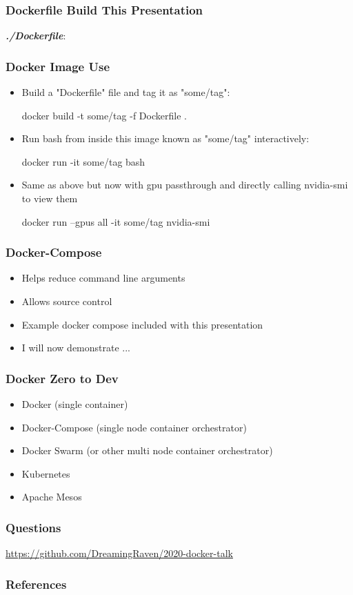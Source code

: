 \documentclass[aspectratio=169]{beamer}
\begin{document}
  \begin{frame}
    \frametitle{Dockerfile Build This Presentation}
    \textbf{\textit{./Dockerfile}}:
  \end{frame}

  \begin{frame}[fragile]%
    \frametitle{Docker Image Use}
    \begin{itemize}
        \item Build a "Dockerfile" file and  tag it as "some/tag":
        \begin{bashcode}
docker build -t some/tag -f Dockerfile .
        \end{bashcode}
        \item Run bash from inside this image known as "some/tag" interactively:
        \begin{bashcode}
docker run -it some/tag bash
        \end{bashcode}
        \item Same as above but now with gpu passthrough and directly calling nvidia-smi to view them
        \begin{bashcode}
docker run --gpus all -it some/tag nvidia-smi
        \end{bashcode}
    \end{itemize}
  \end{frame}

  \begin{frame}
    \frametitle{Docker-Compose}
    \begin{itemize}
        \item Helps reduce command line arguments
        \item Allows source control
        \item Example docker compose included with this presentation
        \item I will now demonstrate ...
    \end{itemize}
  \end{frame}

  \begin{frame}
    \frametitle{Docker Zero to Dev}
    \begin{itemize}
      \item Docker (single container)
      \item Docker-Compose (single node container orchestrator)
      \item Docker Swarm (or other multi node container orchestrator)
    \end{itemize}
    \begin{itemize}
      \item Kubernetes
      \item Apache Mesos
    \end{itemize}
  \end{frame}

  \begin{frame}
      \frametitle{Questions}
      \url{https://github.com/DreamingRaven/2020-docker-talk}
  \end{frame}

  \begin{frame}[allowframebreaks]
    \frametitle{References}
    \printbibliography
  \end{frame}
\end{document}
